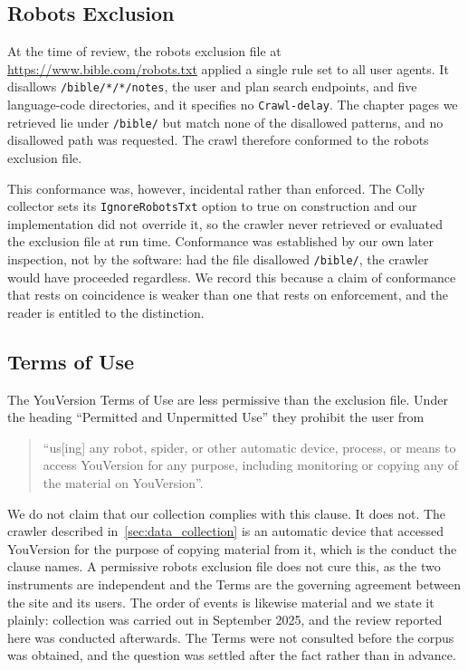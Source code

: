 \subsection{Robots Exclusion}

At the time of review, the robots exclusion file at
\url{https://www.bible.com/robots.txt} applied a single rule set to all user
agents. It disallows \texttt{/bible/*/*/notes}, the user and plan search
endpoints, and five language-code directories, and it specifies no
\texttt{Crawl-delay}. The chapter pages we retrieved lie under \texttt{/bible/}
but match none of the disallowed patterns, and no disallowed path was requested.
The crawl therefore conformed to the robots exclusion file.

This conformance was, however, incidental rather than enforced. The Colly
collector sets its \texttt{IgnoreRobotsTxt} option to true on construction and
our implementation did not override it, so the crawler never retrieved or
evaluated the exclusion file at run time. Conformance was established by our own
later inspection, not by the software: had the file disallowed \texttt{/bible/},
the crawler would have proceeded regardless. We record this because a claim of
conformance that rests on coincidence is weaker than one that rests on
enforcement, and the reader is entitled to the distinction.

\subsection{Terms of Use}

The YouVersion Terms of Use are less permissive than the exclusion file. Under
the heading ``Permitted and Unpermitted Use'' they prohibit the user from

\begin{quote}
    ``us[ing] any robot, spider, or other automatic device, process, or means to
    access YouVersion for any purpose, including monitoring or copying any of the
    material on YouVersion''.
\end{quote}

We do not claim that our collection complies with this clause. It does not. The
crawler described in~\cref{sec:data_collection} is an automatic device that
accessed YouVersion for the purpose of copying material from it, which is the
conduct the clause names. A permissive robots exclusion file does not cure this,
as the two instruments are independent and the Terms are the governing agreement
between the site and its users. The order of events is likewise material and we
state it plainly: collection was carried out in September 2025, and the review
reported here was conducted afterwards. The Terms were not consulted before the
corpus was obtained, and the question was settled after the fact rather than in
advance.

